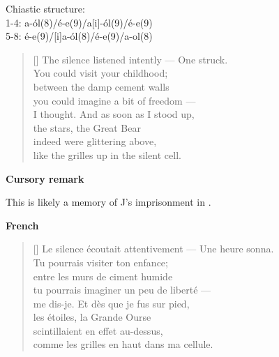\documentclass[a4paper,12pt,twoside,final]{book}
\begin{document}

\noindent Chiastic structure: \\
1-4: a-ól(8)/é-e(9)/a[i]-ól(9)/é-e(9) \\
5-8: é-e(9)/[i]a-ól(8)/é-e(9)/a-ol(8)

\newpage



\settowidth{\versewidth}{The silence listened intently --- One struck.}

\begin{verse}[\versewidth]
  The silence listened intently --- One struck. \\
  You could visit your childhood; \\
  between the damp cement walls \\
  you could imagine a bit of freedom --- \\
  I thought. And as soon as I stood up, \\
  the stars, the Great Bear \\
  indeed were glittering above, \\
  like the grilles up in the silent cell. \\
\end{verse}

\bigskip

\noindent \textbf{Cursory remark}

\medskip

This is likely a memory of J's imprisonment in .

\bigskip

\noindent \textbf{French}


\settowidth{\versewidth}{Le silence écoutait attentivement --- Une heure sonna.}

\begin{verse}[\versewidth]
  Le silence écoutait attentivement --- Une heure sonna. \\
  Tu pourrais visiter ton enfance; \\
  entre les murs de ciment humide \\
  tu pourrais imaginer un peu de liberté --- \\
  me dis-je. Et dès que je fus sur pied, \\
  les étoiles, la Grande Ourse \\
  scintillaient en effet au-dessus, \\
  comme les grilles en haut dans ma cellule. \\
\end{verse}
\end{document}
